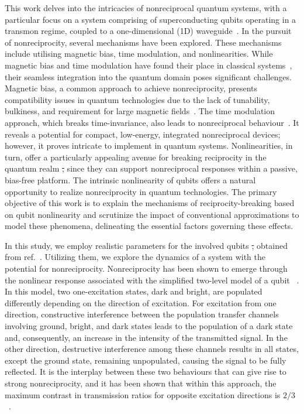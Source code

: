 \documentclass[lettersize,journal]{IEEEtran}
\providecommand{\DIFdeltex}[1]{{\protect\color{red}\sout{#1}}}                      %
\providecommand{\DIFdelbegin}{} %
\providecommand{\DIFdelend}{} %
\providecommand{\DIFdel}[1]{\texorpdfstring{\DIFdeltex{#1}}{}} %
\newcommand{\DIFscaledelfig}{0.5}
\newlength{\DIFdelgraphicswidth} %
\newlength{\DIFdelgraphicsheight} %
\newcommand{\DIFdelincludegraphics}[2][]{%
\sbox{\DIFdelgraphicsbox}{\DIFOincludegraphics[#1]{#2}}%
\settoboxwidth{\DIFdelgraphicswidth}{\DIFdelgraphicsbox} %
\settoboxtotalheight{\DIFdelgraphicsheight}{\DIFdelgraphicsbox} %
\scalebox{\DIFscaledelfig}{%
\parbox[b]{\DIFdelgraphicswidth}{\usebox{\DIFdelgraphicsbox}\\[-\baselineskip] \rule{\DIFdelgraphicswidth}{0em}}\llap{\resizebox{\DIFdelgraphicswidth}{\DIFdelgraphicsheight}{%
\setlength{\unitlength}{\DIFdelgraphicswidth}%
\begin{picture}(1,1)%
\thicklines\linethickness{2pt} %
{\color[rgb]{1,0,0}\put(0,0){\framebox(1,1){}}}%
{\color[rgb]{1,0,0}\put(0,0){\line( 1,1){1}}}%
{\color[rgb]{1,0,0}\put(0,1){\line(1,-1){1}}}%
\end{picture}%
}\hspace*{3pt}}} %
} %
\DeclareRobustCommand{\DIFdelbegin}{\DIFOdelbegin \let\includegraphics\DIFdelincludegraphics} %
\DeclareRobustCommand{\DIFdelend}{\DIFOaddend \let\includegraphics\DIFOincludegraphics} %
\begin{document}
This work delves into the intricacies of nonreciprocal quantum systems, with a particular focus on a system comprising of superconducting qubits operating in a transmon regime, coupled to a one-dimensional (1D) waveguide~\cite{dai_rectification_2015, muller_nonreciprocal_2017, rosario_hamann_nonreciprocity_2018, Nefedkin2022}. In the pursuit of nonreciprocity, several mechanisms have been explored. These mechanisms include utilising magnetic bias, time modulation, and nonlinearities. While magnetic bias and time modulation have found their place in classical systems~\cite{Pozar2011Microwave, Hogan1952Ferromagnetic, sounas_non-reciprocal_2017, wang2020nonreciprocity}, their seamless integration into the quantum domain poses significant challenges. Magnetic bias, a common approach to achieve nonreciprocity, presents compatibility issues in quantum technologies due to the lack of tunability, bulkiness, and requirement for large magnetic fields~\cite{bi2011chip,zhang2019monolithic,ren2021single}. The time modulation approach, which breaks time-invariance, also leads to nonreciprocal behaviour~\cite{sounas_non-reciprocal_2017, wang2020nonreciprocity}. It reveals a potential for compact, low-energy, integrated nonreciprocal devices; however, it proves intricate to implement in quantum systems. Nonlinearities, in turn, offer a particularly appealing avenue for breaking reciprocity in the quantum realm \DIFdelbegin \DIFdel{, }\DIFdelend since they can support nonreciprocal responses within a passive, bias-free platform. The intrinsic nonlinearity of qubits offers a natural opportunity to realize nonreciprocity in quantum technologies. 
The primary objective of this work is to explain the mechanisms of reciprocity-breaking based on qubit nonlinearity and scrutinize the impact of conventional approximations to model these phenomena, delineating the essential factors governing these effects.

In this study, we employ realistic parameters for the involved qubits \DIFdelbegin \DIFdel{, }\DIFdelend obtained from ref.~\cite{rosario_hamann_nonreciprocity_2018}. Utilizing them, we explore the dynamics of a system with the potential for nonreciprocity. Nonreciprocity has been shown to emerge through the nonlinear response associated with the simplified two-level model of a qubit ~\cite{lalumiere_input-output_2013, muller_nonreciprocal_2017}. In this model, two one-excitation states, dark and bright, are populated differently depending on the direction of excitation. For excitation from one direction, constructive interference between the population transfer channels involving ground, bright, and dark states leads to the population of a dark state and, consequently, an increase in the intensity of the transmitted signal. In the other direction, destructive interference among these channels results in all states, except the ground state, remaining unpopulated, causing the signal to be fully reflected. It is the interplay between these two behaviours that can give rise to strong nonreciprocity, and it has been shown that within this approach, the maximum contrast in transmission ratios for opposite excitation directions is $2/3$~\cite{muller_nonreciprocal_2017, Nefedkin2022}.
\end{document}
